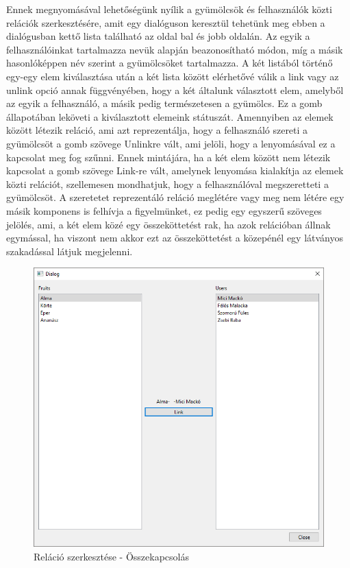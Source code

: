 Ennek megnyomásával lehetőségünk nyílik a gyümölcsök és felhasználók közti relációk szerkesztésére, amit egy dialóguson keresztül tehetünk meg ebben a dialógusban kettő lista található az oldal bal és jobb oldalán. Az egyik a felhasználóinkat tartalmazza nevük alapján beazonosítható módon, míg a másik hasonlóképpen név szerint a gyümölcsöket tartalmazza. A két listából történő egy-egy elem kiválasztása után a két lista között elérhetővé válik a link vagy az unlink opció annak függvényében, hogy a két általunk választott elem, amelyből az egyik a felhasználó, a másik pedig természetesen a gyümölcs. Ez a gomb állapotában leköveti a kiválasztott elemeink státuszát. Amennyiben az elemek között létezik reláció, ami azt reprezentálja, hogy a 
felhasználó szereti a gyümölcsöt a gomb szövege Unlinkre vált, ami jelöli, hogy a lenyomásával ez a kapcsolat meg fog szűnni. Ennek mintájára, ha a két elem között nem létezik kapcsolat a gomb szövege Link-re vált, amelynek lenyomása kialakítja az elemek közti relációt, szellemesen mondhatjuk, hogy a felhasználóval megszeretteti a gyümölcsöt. A szeretetet reprezentáló reláció meglétére vagy meg nem létére egy másik komponens is felhívja a figyelmünket, ez pedig egy egyszerű szöveges jelölés, ami, a két elem közé egy összeköttetést rak, ha azok relációban állnak egymással, ha viszont nem akkor ezt az összeköttetést a közepénél egy látványos szakadással látjuk megjelenni.

\begin{figure}[H]
	\centering
	\includegraphics[width=1\textwidth]{images/Link.png}
	\caption{Reláció szerkesztése - Összekapcsolás}
	\label{fig:main_window}
\end{figure}

